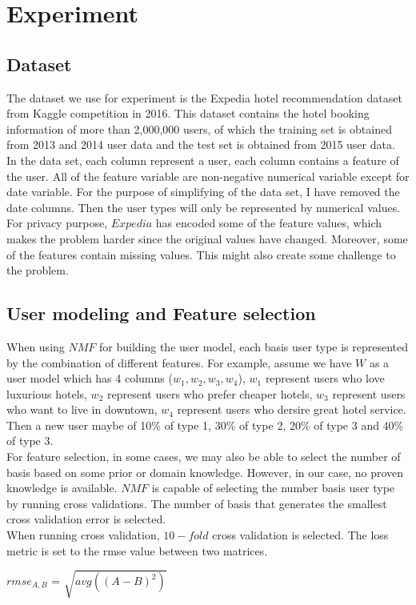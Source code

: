 \documentclass[11pt]{article} %
\begin{document}
\section{Experiment}
\subsection{Dataset}
The dataset we use for experiment is the Expedia hotel recommendation dataset from Kaggle competition in 2016. This dataset contains the hotel booking information of more than 2,000,000 users, of which the training set is obtained from 2013 and 2014 user data and the test set is obtained from 2015 user data.\\
In the data set, each column represent a user, each column contains a feature of the user. All of the feature variable are non-negative numerical variable except for date variable. For the purpose of simplifying of the data set, I have removed the date columns. Then the user types will only be represented by numerical values.\\
For privacy purpose, $Expedia$ has encoded some of the feature values, which makes the problem harder since the original values have changed. Moreover, some of the features contain missing values. This might also create some challenge to the problem.
\subsection{User modeling and Feature selection}
When using $NMF$ for building the user model, each basis user type is represented by the combination of different features. For example, assume we have $W$ as a user model which has 4 columns ($w_{1}, w_{2}, w_{3}, w_{4}$), $w_{1}$ represent users who love luxurious hotels, $w_{2}$ represent users who prefer cheaper hotels, $w_{3}$ represent users who want to live in downtown, $w_{4}$ represent users who dersire great hotel service. Then a new user maybe of 10\% of type 1, 30\% of type 2, 20\% of type 3 and 40\% of type 3.\\    
For feature selection, in some cases, we may also be able to select the number of basis based on some prior or domain knowledge. However, in our case, no proven knowledge is available. $NMF$ is capable of selecting the number basis user type by running cross validations. The number of basis that generates the smallest cross validation error is selected.\\
When running cross validation, $10-fold$ cross validation is selected. The loss metric is set to the rmse value between two matrices.\\
\centerline{$rmse_{A,B}$ = $\sqrt{avg((A-B)^{2})}$}
\end{document}
